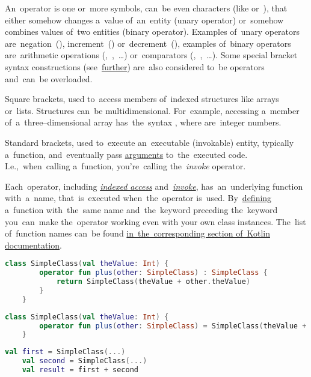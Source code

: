 An~operator is one or~more symbols, can~be even characters (like  \mbox{or }), that either somehow changes a~value of~an~entity (unary operator) or~somehow combines values of~two entities (binary operator).
Examples of~unary operators are~negation~(\itq{!}), increment~(\itq{++}) or~decrement~(\itq{-{}-}), examples of~binary operators are~arithmetic operations \mbox{(\itq{+}, \itq{-}, \dots)} or~comparators \mbox{(\itq{<}, \itq{>}, \dots)}.
Some special bracket syntax constructions (see~\hyperref[kotlinindexedaccess]{further}) are~also considered to~be operators and~can~be overloaded.

\label{kotlinindexedaccess}
Square brackets, used to~access members of~indexed structures like arrays or~lists.
Structures can~be multidimensional.
For~example, accessing a~member of~a~three--dimensional array has~the~syntax \mbox{,} where  are~integer numbers.

\label{kotlininvoke}
Standard brackets, used to~execute an~executable (invokable) entity, typically a~function, and~eventually pass \hyperref[parameterargument]{arguments} to~the~executed code.
I.e.,~when~calling a~function, you're~calling the~\textit{invoke} operator.

\label{kotlinoperatoroverload}
Each~operator, including \hyperref[kotlinindexedaccess]{\textit{indexed access}} \mbox{and \hyperref[kotlininvoke]{\textit{invoke}},} has~an~underlying function with~a~name, that~is~executed when~the~operator is~used.
By~\hyperref[declarationdefinition]{defining} a~function with~the~same name and~the~keyword  preceding the~keyword you~can~make the~operator working even with your own class instances.
The~list of~function names can~be found \href{https://kotlinlang.org/docs/reference/operator-overloading.html}{in~the~corresponding section of~Kotlin documentation}.

\begin{lstlisting}[language=Kotlin, title={Custom class with the operator overloading}]
    class SimpleClass(val theValue: Int) {
        operator fun plus(other: SimpleClass) : SimpleClass {
            return SimpleClass(theValue + other.theValue)
        }
    }
\end{lstlisting}
\begin{lstlisting}[language=Kotlin, title={Equivalent with direct assignment simplification}]
    class SimpleClass(val theValue: Int) {
        operator fun plus(other: SimpleClass) = SimpleClass(theValue + other.theValue)
    }
\end{lstlisting}
\begin{lstlisting}[language=Kotlin, title={Usage}]
    val first = SimpleClass(...)
    val second = SimpleClass(...)
    val result = first + second
\end{lstlisting}

